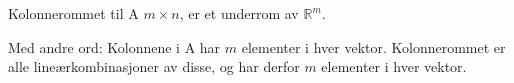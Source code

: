 Kolonnerommet til A $m\times n$, er et underrom av $\mathbb{R}^m$.

Med andre ord: Kolonnene i A har $m$ elementer i hver vektor.
Kolonnerommet er alle lineærkombinasjoner av disse,
og har derfor $m$ elementer i hver vektor.
